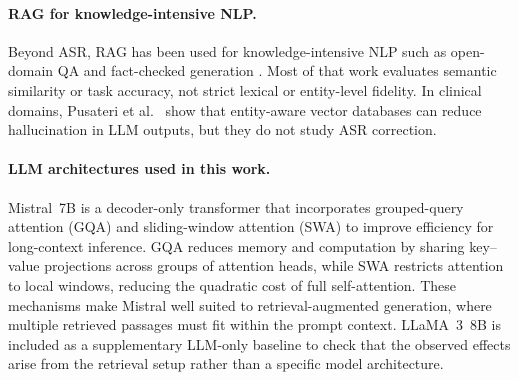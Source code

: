 \documentclass[11pt,a4paper,twocolumn]{article}
\begin{document}
\paragraph{RAG for knowledge-intensive NLP.}
Beyond ASR, RAG has been used for knowledge-intensive NLP such as open-domain
QA and fact-checked generation \cite{lewis2020}. Most of that work evaluates
semantic similarity or task accuracy, not strict lexical or entity-level
fidelity. In clinical domains, Pusateri et al.\ \cite{pusateri2024} show that
entity-aware vector databases can reduce hallucination in LLM outputs, but they
do not study ASR correction.

\paragraph{LLM architectures used in this work.}
Mistral~7B \cite{jiang2023} is a decoder-only transformer that incorporates
grouped-query attention (GQA) and sliding-window attention (SWA) to improve
efficiency for long-context inference. GQA reduces memory and computation by
sharing key--value projections across groups of attention heads, while SWA
restricts attention to local windows, reducing the quadratic cost of full
self-attention. These mechanisms make Mistral well suited to retrieval-augmented
generation, where multiple retrieved passages must fit within the prompt
context. LLaMA~3~8B is included as a supplementary LLM-only baseline to check
that the observed effects arise from the retrieval setup rather than a specific
model architecture.
\end{document}
